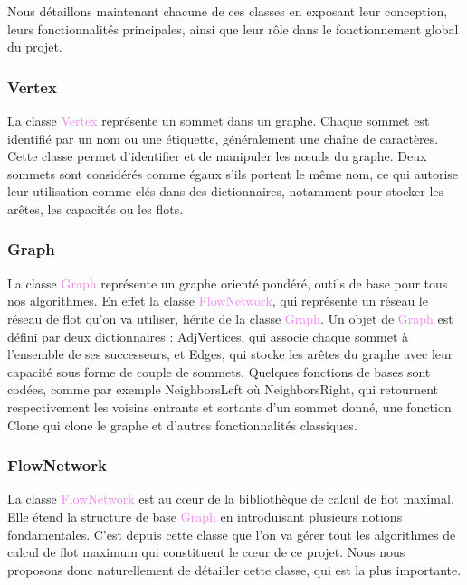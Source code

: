 \documentclass[a4paper]{article}
\begin{document}
Nous détaillons maintenant chacune de ces classes en exposant leur conception, leurs fonctionnalités principales, ainsi que leur rôle dans le fonctionnement global du projet.

\subsubsection{Vertex}

La classe \textcolor{violet}{Vertex} représente un sommet dans un graphe. Chaque sommet est identifié par un nom ou une étiquette, généralement une chaîne de caractères. Cette classe permet d'identifier et de manipuler les nœuds du graphe. Deux sommets sont considérés comme égaux s'ils portent le même nom, ce qui autorise leur utilisation comme clés dans des dictionnaires, notamment pour stocker les arêtes, les capacités ou les flots.

\subsubsection{Graph}

La classe \textcolor{violet}{Graph} représente un graphe orienté pondéré, outils de base pour tous nos algorithmes. En effet la classe \textcolor{violet}{FlowNetwork}, qui représente un réseau le réseau de flot qu'on va utiliser, hérite de la classe \textcolor{violet}{Graph}. Un objet de \textcolor{violet}{Graph} est défini par deux dictionnaires : \textcolor{blue!60}{AdjVertices}, qui associe chaque sommet à l'ensemble de ses successeurs, et \textcolor{blue!60}{Edges}, qui stocke les arêtes du graphe avec leur capacité sous forme de couple de sommets.
Quelques fonctions de bases sont codées, comme par exemple \textcolor{green!60!black}{NeighborsLeft} où \textcolor{green!60!black}{NeighborsRight}, qui retournent respectivement les voisins entrants et sortants d'un sommet donné, une fonction \textcolor{green!60!black}{Clone} qui clone le graphe et d'autres fonctionnalités classiques.

\subsubsection{FlowNetwork}

La classe \textcolor{violet}{FlowNetwork} est au cœur de la bibliothèque de calcul de flot maximal. Elle étend la structure de base \textcolor{violet}{Graph} en introduisant plusieurs notions fondamentales. C'est depuis cette classe que l'on va gérer tout les algorithmes de calcul de flot maximum qui constituent le cœur de ce projet. Nous nous proposons donc naturellement de détailler cette classe, qui est la plus importante.\\
\end{document}
